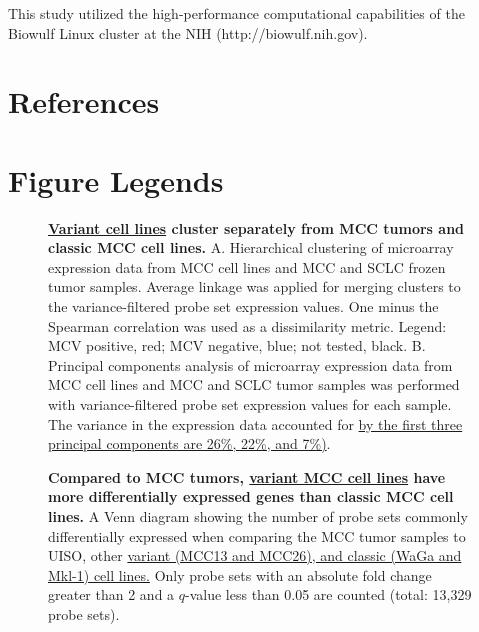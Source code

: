 \documentclass[10pt]{article}
\begin{document}
This study utilized the high-performance computational capabilities of the Biowulf Linux cluster at the NIH (http://biowulf.nih.gov).

\section*{References}
\begin{singlespace}

\end{singlespace}

\newpage

\section*{Figure Legends}

\begin{figure}[!ht]
  \begin{center}
  \end{center}
  
  \caption{
    {\bf \uline{Variant cell lines} cluster separately from MCC tumors and classic MCC cell lines.}
    A. Hierarchical clustering of microarray expression data from MCC cell lines and MCC and SCLC frozen tumor samples.
    Average linkage was applied for merging clusters to the variance-filtered probe set expression values.
    One minus the Spearman correlation was used as a dissimilarity metric.
    Legend: MCV positive, red; MCV negative, blue; not tested, black.
    B. Principal components analysis of microarray expression data from MCC cell lines and MCC and SCLC tumor samples was performed with variance-filtered probe set expression values for each sample.
    The variance in the expression data accounted for \uline{by the first three principal components are 26\%, 22\%, and 7\%)}.}
  
  \label{fig:clustering}

\end{figure}

\begin{figure}[!ht]

  \begin{center}
  \end{center}

  \caption{
    {\bf Compared to MCC tumors, \uline{variant MCC cell lines} have more differentially expressed genes than classic MCC cell lines.}
    A Venn diagram showing the number of probe sets commonly differentially expressed when comparing the MCC tumor samples to UISO, other \uline{variant (MCC13 and MCC26), and classic (WaGa and Mkl-1) cell lines.}
    Only probe sets with an absolute fold change greater than 2 and a $q$-value less than 0.05 are counted (total: 13,329 probe sets).}

  \label{fig:venn}
\end{figure}
\end{document}
